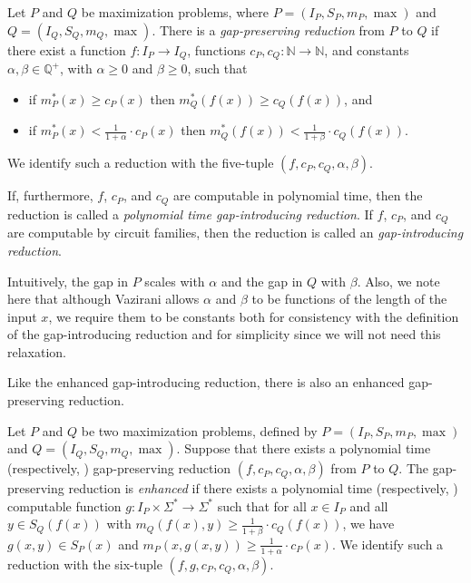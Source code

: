\documentclass[]{article}
\begin{document}
\begin{definition}
  Let $P$ and $Q$ be maximization problems, where $P = (I_P, S_P, m_P, \max)$ and $Q = (I_Q, S_Q, m_Q, \max)$.
  There is a \emph{gap-preserving reduction} from $P$ to $Q$ if there exist a function $f \colon I_P \to I_Q$, functions $c_P, c_Q \colon \mathbb{N} \to \mathbb{N}$, and constants $\alpha, \beta \in \mathbb{Q}^+$, with $\alpha \geq 0$ and $\beta \geq 0$, such that
  \begin{itemize}
  \item if $m^*_P(x) \geq c_P(x)$ then $m^*_Q(f(x)) \geq c_Q(f(x))$, and
  \item if $m^*_P(x) < \frac{1}{1 + \alpha} \cdot c_P(x)$ then $m^*_Q(f(x)) < \frac{1}{1 + \beta} \cdot c_Q(f(x))$.
  \end{itemize}
  We identify such a reduction with the five-tuple $(f, c_P, c_Q, \alpha, \beta)$.

  If, furthermore, $f$, $c_P$, and $c_Q$ are computable in polynomial time, then the reduction is called a \emph{polynomial time gap-introducing reduction}.
  If $f$, $c_P$, and $c_Q$ are computable by \FNC{} circuit families, then the reduction is called an \emph{\NC{} gap-introducing reduction}.
\end{definition}

Intuitively, the gap in $P$ scales with $\alpha$ and the gap in $Q$ with $\beta$.
Also, we note here that although Vazirani allows $\alpha$ and $\beta$ to be functions of the length of the input $x$, we require them to be constants both for consistency with the definition of the gap-introducing reduction and for simplicity since we will not need this relaxation.

Like the enhanced gap-introducing reduction, there is also an enhanced gap-preserving reduction.

\begin{definition}
  Let $P$ and $Q$ be two maximization problems, defined by $P = (I_P, S_P, m_P, \max)$ and $Q = (I_Q, S_Q, m_Q, \max)$.
  Suppose that there exists a polynomial time (respectively, \NC) gap-preserving reduction $(f, c_P, c_Q, \alpha, \beta)$ from $P$ to $Q$.
  The gap-preserving reduction is \emph{enhanced} if there exists a polynomial time (respectively, \NC) computable function $g \colon I_P \times \Sigma^* \to \Sigma^*$ such that for all $x \in I_P$ and all $y \in S_Q(f(x))$ with $m_Q(f(x), y) \geq \frac{1}{1 + \beta} \cdot c_Q(f(x))$, we have $g(x, y) \in S_P(x)$ and $m_P(x, g(x, y)) \geq \frac{1}{1 + \alpha} \cdot c_P(x)$.
  We identify such a reduction with the six-tuple $(f, g, c_P, c_Q, \alpha, \beta)$.
\end{definition}
\end{document}
